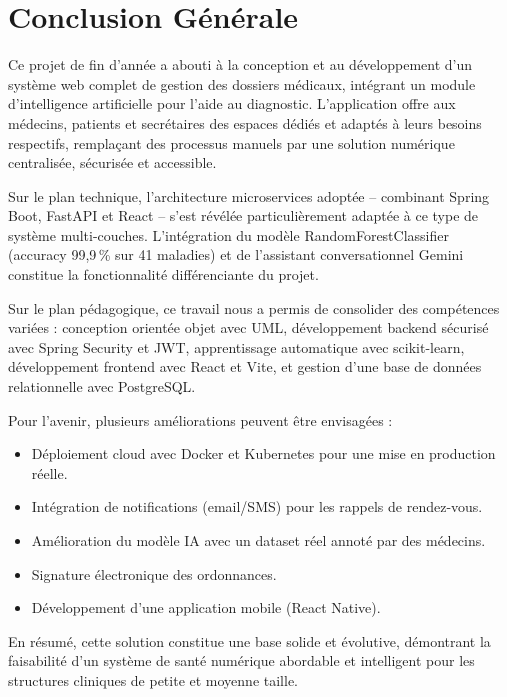 \documentclass[12pt,a4paper]{report}
\begin{document}
\chapter*{Conclusion Générale}
\thispagestyle{fancy}

Ce projet de fin d'année a abouti à la conception et au développement d'un système
web complet de gestion des dossiers médicaux, intégrant un module d'intelligence
artificielle pour l'aide au diagnostic. L'application offre aux médecins, patients et
secrétaires des espaces dédiés et adaptés à leurs besoins respectifs, remplaçant des
processus manuels par une solution numérique centralisée, sécurisée et accessible.

Sur le plan technique, l'architecture microservices adoptée -- combinant Spring Boot,
FastAPI et React -- s'est révélée particulièrement adaptée à ce type de système
multi-couches. L'intégration du modèle RandomForestClassifier (accuracy 99,9\,\% sur
41 maladies) et de l'assistant conversationnel Gemini constitue la fonctionnalité
différenciante du projet.

Sur le plan pédagogique, ce travail nous a permis de consolider des compétences variées :
conception orientée objet avec UML, développement backend sécurisé avec Spring Security
et JWT, apprentissage automatique avec scikit-learn, développement frontend avec React
et Vite, et gestion d'une base de données relationnelle avec PostgreSQL.

Pour l'avenir, plusieurs améliorations peuvent être envisagées :
\begin{itemize}
    \item Déploiement cloud avec Docker et Kubernetes pour une mise en production
    réelle.
    \item Intégration de notifications (email/SMS) pour les rappels de rendez-vous.
    \item Amélioration du modèle IA avec un dataset réel annoté par des médecins.
    \item Signature électronique des ordonnances.
    \item Développement d'une application mobile (React Native).
\end{itemize}

En résumé, cette solution constitue une base solide et évolutive, démontrant la
faisabilité d'un système de santé numérique abordable et intelligent pour les structures
cliniques de petite et moyenne taille.

\end{document}
